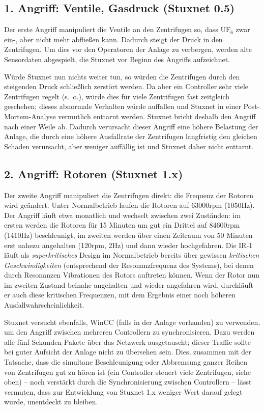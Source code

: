\documentclass[a4paper]{article}
\begin{document}
\subsection{1. Angriff: Ventile, Gasdruck (Stuxnet 0.5)}

Der erste Angriff manipuliert die Ventile an den Zentrifugen so,
dass $\mathrm{UF}_6$ zwar ein-, aber nicht mehr abfließen kann.
Dadurch steigt der Druck in den Zentrifugen.
Um dies vor den Operatoren der Anlage zu verbergen,
werden alte Sensordaten abgespielt, die Stuxnet vor Beginn des Angriffs aufzeichnet.

Würde Stuxnet nun nichts weiter tun, so würden die Zentrifugen durch den steigenden Druck schließlich zerstört werden.
Da aber ein Controller sehr viele Zentrifugen regelt (s.~o.), würde dies für viele Zentrifugen fast zeitgleich geschehen;
dieses abnormale Verhalten würde auffallen und Stuxnet in einer Post-Mortem-Analyse vermutlich enttarnt werden.
Stuxnet bricht deshalb den Angriff nach einer Weile ab.
Dadurch verursacht dieser Angriff eine höhere Belastung der Anlage,
die durch eine höhere Ausfallrate der Zentrifugen langfristig den gleichen Schaden verursacht,
aber weniger auffällig ist und Stuxnet daher nicht enttarnt.

\subsection{2. Angriff: Rotoren (Stuxnet 1.x)}

Der zweite Angriff manipuliert die Zentrifugen direkt: die Frequenz der Rotoren wird geändert.
Unter Normalbetrieb laufen die Rotoren auf 63000rpm (1050Hz).
Der Angriff läuft etwa monatlich und wechselt zwischen zwei Zuständen:
im ersten werden die Rotoren für 15 Minuten um gut ein Drittel auf 84600rpm (1410Hz) beschleunigt,
im zweiten werden über einen Zeitraum von 50 Minuten erst nahezu angehalten (120rpm, 2Hz) und dann wieder hochgefahren.
Die IR-1 läuft als \emph{superkritisches} Design im Normalbetrieb bereits über gewissen \emph{kritischen Geschwindigkeiten}
(entsprechend der Resonanzfrequenz des Systems), bei denen durch Resonanzen Vibrationen des Rotors auftreten können.
Wenn der Rotor nun im zweiten Zustand beinahe angehalten und wieder angefahren wird,
durchläuft er auch diese kritischen Frequenzen, mit dem Ergebnis einer noch höheren Ausfallwahrscheinlichkeit.

Stuxnet versucht ebenfalls, WinCC (falls in der Anlage vorhanden) zu verwenden, um den Angriff zwischen mehreren Controllern zu synchronisieren.\cite{dossier} %
Dazu werden alle fünf Sekunden Pakete über das Netzwerk ausgetauscht; dieser Traffic sollte bei guter Aufsicht der Anlage nicht zu übersehen sein.
Dies, zusammen mit der Tatsache, dass die simultane Beschleunigung oder Abbremsung ganzer Reihen von Zentrifugen gut zu hören ist
(ein Controller steuert viele Zentrifugen, siehe oben) – noch verstärkt durch die Synchronisierung zwischen Controllern –
lässt vermuten, dass zur Entwicklung von Stuxnet 1.x weniger Wert darauf gelegt wurde, unentdeckt zu bleiben.
\end{document}
